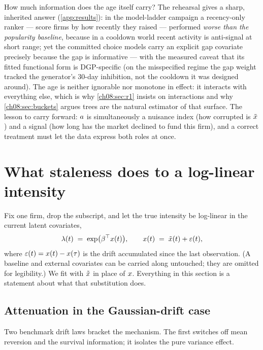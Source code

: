 How much information does the age itself carry? The rehearsal gives a
sharp, inherited answer (\cref{app:results}): in the model-ladder
campaign a recency-only ranker --- score firms by how recently they
raised --- performed \emph{worse than the popularity baseline}, because
in a cooldown world recent activity is anti-signal at short range; yet
the committed choice models carry an explicit gap covariate precisely
because the gap is informative --- with the measured caveat that its
fitted functional form is DGP-specific (on the misspecified regime the
gap weight tracked the generator's 30-day inhibition, not the cooldown
it was designed around). The age is neither ignorable nor
monotone in effect: it interacts with everything else, which is why
\cref{ch08:sec:r1} insists on interactions and why
\cref{ch08:sec:buckets} argues trees are the natural estimator of that
surface. The lesson to carry forward: $a$ is simultaneously a
nuisance index (how corrupted is $\tilde{x}$) and a signal (how
long has the market declined to fund this firm), and a correct treatment
must let the data express both roles at once.

\section{What staleness does to a log-linear intensity}
\label{ch08:sec:consequences}

Fix one firm, drop the subscript, and let the true intensity be
log-linear in the current latent covariates,
\begin{equation}\label{eq:ch08:truelam}
\lambda(t) \;=\; \exp\!\big(\beta^{\top} x(t)\big),
\qquad
x(t) \;=\; \tilde{x}(t) + \varepsilon(t),
\end{equation}
where $\varepsilon(t) = x(t) - x(\tau)$ is the drift accumulated since
the last observation. (A baseline and external covariates can be carried
along untouched; they are omitted for legibility.) We fit with
$\tilde{x}$ in place of $x$. Everything in this section is a
statement about what that substitution does.

\subsection{Attenuation in the Gaussian-drift case}
\label{ch08:sec:attenuation}

Two benchmark drift laws bracket the mechanism. The first switches off
mean reversion and the survival information; it isolates the pure
variance effect.

